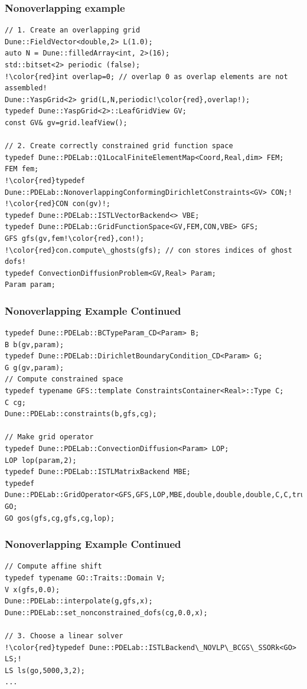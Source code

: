\documentclass[aspectratio=169,11pt]{beamer}
\theoremstyle{definition}
\begin{document}
\begin{frame}[fragile]
  \frametitle{Nonoverlapping example}
  \begin{lstlisting}[breaklines=true,escapechar=!]
// 1. Create an overlapping grid
Dune::FieldVector<double,2> L(1.0);
auto N = Dune::filledArray<int, 2>(16);
std::bitset<2> periodic (false);
!\color{red}int overlap=0; // overlap 0 as overlap elements are not assembled!
Dune::YaspGrid<2> grid(L,N,periodic!\color{red},overlap!);
typedef Dune::YaspGrid<2>::LeafGridView GV;
const GV& gv=grid.leafView();

// 2. Create correctly constrained grid function space
typedef Dune::PDELab::Q1LocalFiniteElementMap<Coord,Real,dim> FEM;
FEM fem;
!\color{red}typedef Dune::PDELab::NonoverlappingConformingDirichletConstraints<GV> CON;!
!\color{red}CON con(gv)!;
typedef Dune::PDELab::ISTLVectorBackend<> VBE;
typedef Dune::PDELab::GridFunctionSpace<GV,FEM,CON,VBE> GFS;
GFS gfs(gv,fem!\color{red},con!);
!\color{red}con.compute\_ghosts(gfs); // con stores indices of ghost dofs!
typedef ConvectionDiffusionProblem<GV,Real> Param;
Param param;
\end{lstlisting}
\end{frame}
\begin{frame}[fragile]
\frametitle<presentation>{Nonoverlapping Example Continued}
  \begin{lstlisting}[breaklines=true]
typedef Dune::PDELab::BCTypeParam_CD<Param> B;
B b(gv,param);
typedef Dune::PDELab::DirichletBoundaryCondition_CD<Param> G;
G g(gv,param);
// Compute constrained space
typedef typename GFS::template ConstraintsContainer<Real>::Type C;
C cg;
Dune::PDELab::constraints(b,gfs,cg);

// Make grid operator
typedef Dune::PDELab::ConvectionDiffusion<Param> LOP;
LOP lop(param,2);
typedef Dune::PDELab::ISTLMatrixBackend MBE;
typedef Dune::PDELab::GridOperator<GFS,GFS,LOP,MBE,double,double,double,C,C,true> GO;
GO gos(gfs,cg,gfs,cg,lop);
\end{lstlisting}
\end{frame}
\begin{frame}[fragile]
\frametitle<presentation>{Nonoverlapping Example Continued}
  \begin{lstlisting}[breaklines=true,escapechar=!]
// Compute affine shift
typedef typename GO::Traits::Domain V;
V x(gfs,0.0);
Dune::PDELab::interpolate(g,gfs,x);
Dune::PDELab::set_nonconstrained_dofs(cg,0.0,x);

// 3. Choose a linear solver
!\color{red}typedef Dune::PDELab::ISTLBackend\_NOVLP\_BCGS\_SSORk<GO> LS;!
LS ls(go,5000,3,2);
...
\end{lstlisting}

\end{frame}
\end{document}
